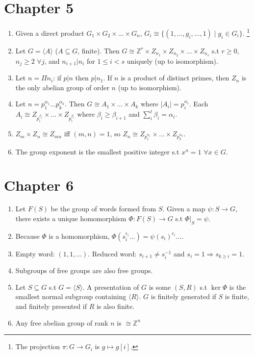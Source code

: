 \documentclass{article}
\begin{document}
\section*{Chapter 5}

\begin{enumerate}[1.]
    \item Given a direct product $G_1 \times G_2 \times ... \times G_n$,
        $G_i \cong \{(1, ..., g_i, ..., 1) \mid g_i \in G_i\}$.
        \footnote{The projection $\pi : G \rightarrow G_i$ is $g \mapsto
        g[i]$.}
    \item Let $G = \langle A \rangle$ ($A \subseteq G$, finite). Then $G \cong
        \mathbb{Z}^r \times Z_{n_1} \times Z_{n_2} \times ... \times
        Z_{n_s}$ s.t $r \geq 0$, $n_j \geq 2$ $\forall j$, and $n_{i+1} |
        n_i$ for $1 \leq i < s$ uniquely (up to isomorphism).
    \item Let $n = \Pi n_i$: if $p | n$ then $p | n_1$. If $n$ is a product
        of distinct primes, then $Z_n$ is the only abelian group of order
        $n$ (up to isomorphism).
    \item Let $n = p_1^{\alpha_1}...p_k^{\alpha_k}$. Then $G \cong A_1
        \times ... \times A_k$ where $|A_i| = p_i^{\alpha_i}$. Each $A_i
        \cong Z_{p_i^{\beta_1}} \times ... \times Z_{p_i^{\beta_t}}$ where
        $\beta_i \geq \beta_{i+1}$ and $\sum_i^t \beta_i = \alpha_i$.
    \item $Z_m \times Z_n \cong Z_{mn}$ iff $(m, n) = 1$, so $Z_n \cong
        Z_{p_1^{\alpha_1}} \times ... \times Z_{p_k^{\alpha_k}}$.
    \item The group exponent is the smallest positive integer s.t $x^n = 1$
        $\forall x \in G$.
\end{enumerate}

\section*{Chapter 6}

\begin{enumerate}[1.]
    \item Let $F(S)$ be the group of words formed from $S$.
        Given a map $\psi : S \rightarrow G$, there exists a unique
        homomorphism $\Phi : F(S) \rightarrow G$ s.t $\Phi|_S = \psi$.
    \item Because $\Phi$ is a homomorphism, $\Phi(s_i^{\epsilon_i} ...) =
        \psi(s_i)^{\epsilon_i} ...$.
    \item Empty word: $(1, 1, ...)$. Reduced word: $s_{i+1} \not= s_i^{-1}$
        and $s_i = 1 \Rightarrow s_{k \geq i} = 1$.
    \item Subgroups of free groups are also free groups.
    \item Let $S \subseteq G$ s.t $G = \langle S \rangle$. A presentation of
        $G$ is some $(S, R)$ s.t $\ker \Phi$ is the smallest normal subgroup
        containing $\langle R \rangle$. $G$ is finitely generated if $S$ is
        finite, and finitely presented if $R$ is also finite.
    \item Any free abelian group of rank $n$ is $\cong \mathbb{Z}^n$
\end{enumerate}
\end{document}
